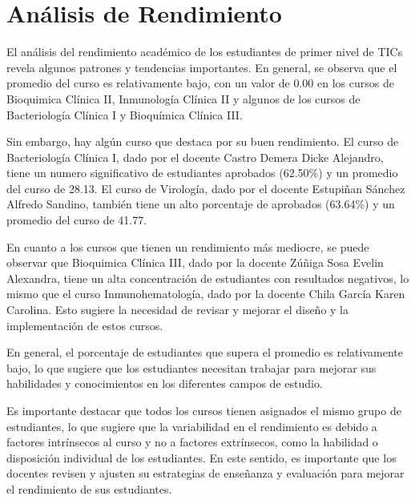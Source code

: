\vspace{1cm}
\section{Análisis de Rendimiento}
El análisis del rendimiento académico de los estudiantes de primer nivel de TICs revela algunos patrones y tendencias importantes. En general, se observa que el promedio del curso es relativamente bajo, con un valor de 0.00 en los cursos de Bioquimica Clínica II, Inmunología Clínica II y algunos de los cursos de Bacteriología Clínica I y Bioquímica Clínica III.

Sin embargo, hay algún curso que destaca por su buen rendimiento. El curso de Bacteriología Clínica I, dado por el docente Castro Demera Dicke Alejandro, tiene un numero significativo de estudiantes aprobados (62.50\%) y un promedio del curso de 28.13. El curso de Virología, dado por el docente Estupiñan Sánchez Alfredo Sandino, también tiene un alto porcentaje de aprobados (63.64\%) y un promedio del curso de 41.77.

En cuanto a los cursos que tienen un rendimiento más mediocre, se puede observar que Bioquimica Clínica III, dado por la docente Zúñiga Sosa Evelin Alexandra, tiene un alta concentración de estudiantes con resultados negativos, lo mismo que el curso Inmunohematología, dado por la docente Chila García Karen Carolina. Esto sugiere la necesidad de revisar y mejorar el diseño y la implementación de estos cursos.

En general, el porcentaje de estudiantes que supera el promedio es relativamente bajo, lo que sugiere que los estudiantes necesitan trabajar para mejorar sus habilidades y conocimientos en los diferentes campos de estudio.

Es importante destacar que todos los cursos tienen asignados el mismo grupo de estudiantes, lo que sugiere que la variabilidad en el rendimiento es debido a factores intrínsecos al curso y no a factores extrínsecos, como la habilidad o disposición individual de los estudiantes. En este sentido, es importante que los docentes revisen y ajusten su estrategias de enseñanza y evaluación para mejorar el rendimiento de sus estudiantes.

